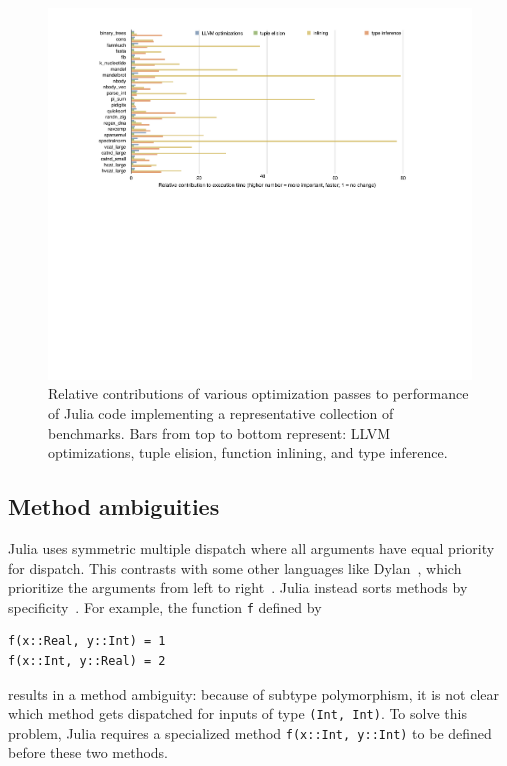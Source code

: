 \documentclass[pldi]{sigplanconf-pldi15}
\begin{document}
\begin{figure}
	\includegraphics[width=\textwidth]{fig-timings}
	\caption{Relative contributions of various optimization passes to
	performance of Julia code implementing a representative collection
	of benchmarks. Bars from top to bottom represent: LLVM
	optimizations, tuple elision, function inlining, and type inference.}
	\label{fig:timings}
\end{figure}


\subsection{Method ambiguities}

Julia uses symmetric multiple dispatch where all arguments have equal priority
for dispatch. This contrasts with some other languages like
Dylan~\cite{dylanman}, which
prioritize the arguments from left to right~\cite{Agrawal1991}. Julia instead
sorts methods by specificity~\cite{Bezanson2012}. For example, the function
\verb|f| defined by 

\begin{lstlisting}
f(x::Real, y::Int) = 1
f(x::Int, y::Real) = 2
\end{lstlisting}
%
results in a method ambiguity: because of subtype polymorphism, it is not clear
which method gets dispatched for inputs of type \verb|(Int, Int)|. To solve
this problem, Julia
requires a specialized method \verb|f(x::Int, y::Int)| to be defined before
these two methods.
\end{document}
